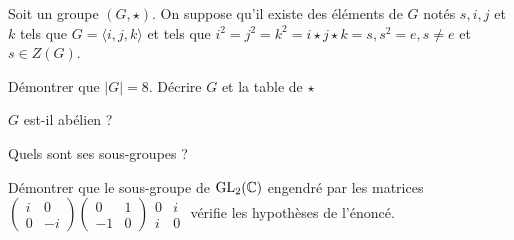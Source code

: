 \documentclass{report}
\begin{document}
\begin{exo}
    Soit un groupe \(\left(G,\star\right)\). On suppose qu'il existe
    des éléments de \(G\) notés \(s,i,j\) et \(k\) tels que \(G=\langle
    i,j,k\rangle\) et tels que \(i^2=j^2=k^2=i\star j\star k=s, s^2=e,
    s\neq e\) et \(s\in Z(G)\).
    \begin{q}{1}
        Démontrer que \(|G|=8\). Décrire \(G\) et la table de \(\star\)
    \end{q}
    \begin{q}{2}
        \(G\) est-il abélien ?
    \end{q}
    \begin{q}{3}
        Quels sont ses sous-groupes ?
    \end{q}
    \begin{q}{4}
        Démontrer que le sous-groupe de \(\mathrm{GL}_2(\mathbb{C})\) engendré
        par les matrices \(\begin{pmatrix} i&0\\0&-i\end{pmatrix}\begin{pmatrix}
        0&1\\-1&0\end{pmatrix}\begin{matrix} 0&i\\i&0\end{matrix}\) vérifie
        les hypothèses de l'énoncé.
    \end{q}
\end{exo}
\end{document}
